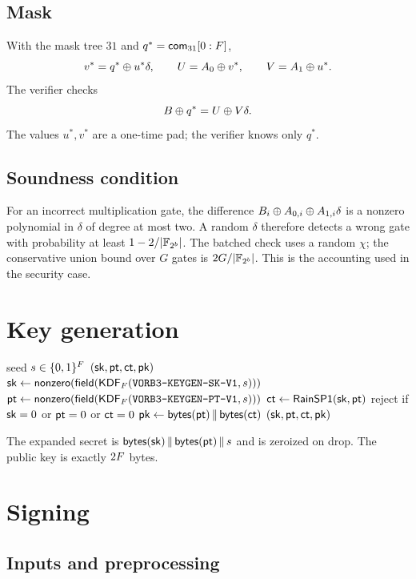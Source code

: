 \documentclass[11pt,a4paper]{article}
\begin{document}
\subsection{Mask}

With the mask tree $31$ and $q^\ast=\mathsf{com}_{31}[0:F]$,
\[
v^\ast=q^\ast\oplus u^\ast\delta,\qquad
U=A_0\oplus v^\ast,\qquad
V=A_1\oplus u^\ast.
\]
The verifier checks
\[
B\oplus q^\ast=U\oplus V\delta.
\]
The values $u^\ast,v^\ast$ are a one-time pad; the verifier knows only
$q^\ast$.

\subsection{Soundness condition}

For an incorrect multiplication gate, the difference
$B_i\oplus A_{0,i}\oplus A_{1,i}\delta$ is a nonzero polynomial in $\delta$ of
degree at most two. A random $\delta$ therefore detects a wrong gate with
probability at least $1-2/|\mathbb{F}_{2^{b}}|$. The batched check uses a random $\chi$;
the conservative union bound over $G$ gates is $2G/|\mathbb{F}_{2^{b}}|$. This is the
accounting used in the security case.

\section{Key generation}

\begin{algorithm}[ht]
\caption{$\Gen(\mathsf{seed})$}
\label{alg:keygen}
\begin{algorithmic}[1]
\REQUIRE seed $s\in\{0,1\}^{F}$
\ENSURE $(\mathsf{sk},\mathsf{pt},\mathsf{ct},\mathsf{pk})$
\STATE $\mathsf{sk}\gets\mathsf{nonzero}(\mathsf{field}(\mathsf{KDF}_F(\texttt{VORB3-KEYGEN-SK-V1},s)))$
\STATE $\mathsf{pt}\gets\mathsf{nonzero}(\mathsf{field}(\mathsf{KDF}_F(\texttt{VORB3-KEYGEN-PT-V1},s)))$
\STATE $\mathsf{ct}\gets\mathsf{RainSP1}(\mathsf{sk},\mathsf{pt})$
\STATE reject if $\mathsf{sk}=0$ or $\mathsf{pt}=0$ or $\mathsf{ct}=0$
\STATE $\mathsf{pk}\gets\mathsf{bytes}(\mathsf{pt})\,\|\,\mathsf{bytes}(\mathsf{ct})$
\RETURN $(\mathsf{sk},\mathsf{pt},\mathsf{ct},\mathsf{pk})$
\end{algorithmic}
\end{algorithm}

The expanded secret is $\mathsf{bytes}(\mathsf{sk})\,\|\,\mathsf{bytes}(\mathsf{pt})
\,\|\, s$ and is zeroized on drop. The public key is exactly $2F$ bytes.

\section{Signing}

\subsection{Inputs and preprocessing}
\end{document}

